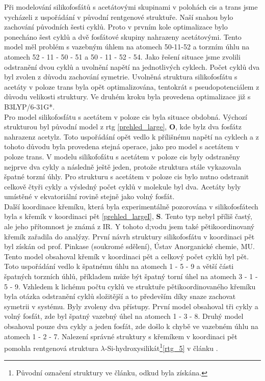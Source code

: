 \documentclass[
digital, %
table,   %
lof,     %
lot,     %
oneside,
]{fithesis3}
\begin{document}
Při modelování silikofosfátů s acetátovými skupinami v polohách cis a trans jsme vycházeli z uspořádání v původní rentgenové struktuře. Naší snahou bylo zachování původních šesti cyklů. Proto v prvním kole optimalizace bylo ponecháno šest cyklů a dvě fosfátové skupiny nahrazeny acetátovými. Tento model měl problém s vazebným úhlem na atomech 50-11-52 a torzním úhlu na atomech 52 - 11 - 50 - 51 a 50 - 11 - 52 - 54. Jako řešení situace jsme zvolili odstranění dvou cyklů a uvolnění napětí na jednotlivých cyklech. Počet cyklů dva byl zvolen z důvodu zachování symetrie. Uvolněná struktura silikofosfátu s acetáty v poloze trans byla opět optimalizována, tentokrát s pseudopotenciálem z důvodu velikosti struktury. Ve druhém kroku byla provedena optimalizace již s B3LYP/6-31G*. \\
Pro model silikofosfátu s acetátem v poloze cis byla situace obdobná. Výchozí strukturou byl původní model z rtg \ref{prehled_large}, \textbf{O}, kde bylz dva fosfátz nahrazenz acetylz. Toto uspořádání opět vedlo k přílišnému napětí na cyklech a z tohoto důvodu byla provedena stejná operace, jako pro model s acetátem v poloze trans. V modelu silikofofátu s acetátem v poloze cis byly odstraněny nejprve dva cykly a následně ještě jeden, protože struktura stále vykazovala špatné torzní úhly.
Pro strukturu s acetátem v poloze cis bylo nutno odstranit celkově čtyři cykly a výsledný počet cyklů v molekule byl dva. Acetáty byly umístěné v ekvatoriální rovině stejně jako volný fosfát. \\
Další koordinace křemíku, která byla experimentálně pozorována v silikofosfátech byla s křemík v koordinaci pět \ref{prehled_largeI}, \textbf{S}. Tento typ nebyl příliš častý, ale jeho přítomnost je známá z IR. Y tohoto d;vodu jsem také pětikoordinovaný křemík zařadila do analýzy. První návrh struktury silikofosfátu v koordinaci pět byl získán od prof. Pinkase (soukromé sdělení), Ústav Anorganické chemie, MU. Tento model obsahoval křemík v koordinaci pět a celkový počet cyklů byl pět. Toto uspořádání vedlo k špatnému úhlu na atomech 1 - 5 - 9 a větší části špatných torzních úhlů, příkladem může být špatný torní úhel na atomech 3 - 1 - 5 - 9.  Vzhledem k lichému počtu cyklů ve struktuře pětikoordinovaného křemíku byla otázka odstranění cyklů složitější a to především díky snaze zachovat symetrii v systému. Byly zvoleny dva přístupy. První model obsahoval tři cykly a volný fosfát, zde byl špatný vazebný úhel na atomech 1 - 3 - 8. Druhý model obsahoval pouze dva cykly a jeden fosfát, zde došlo k chybě ve vazebném úhlu na atomech 1 - 2 - 7. Nalezení správné struktury s křemíkem v koordinaci pět pomohla rentgenová struktura $\lambda$-Si-hydroxysilikát\footnote{Původní označení struktury ve článku, odkud byla získána.}\ref{rtg_5} v článku \cite{rtg_5}.
\end{document}

